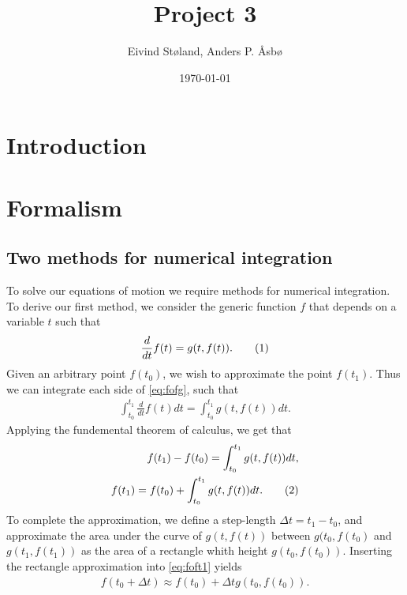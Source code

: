 \documentclass[reprint,english,notitlepage]{revtex4-1}  %
\newcommand\numberthis{\addtocounter{equation}{1}\tag{\theequation}}
\begin{document}
\title{Project 3}   %
\author{Eivind Støland, Anders P. Åsbø}               %
\date{\today}                             %
\noaffiliation                            %

\maketitle                                %


\tableofcontents

\section{Introduction} \label{sec:I}

\section{Formalism} \label{sec:II}

\subsection{Two methods for numerical integration} \label{sec:II:a}
To solve our equations of motion we require methods for numerical integration. To derive our first method, we consider the generic function \(f\) that depends on a variable \(t\) such that
\begin{align*}
	\frac{d}{dt}f(t) = g(t, f(t)). \numberthis \label{eq:fofg}
\end{align*}
Given an arbitrary point \(f(t_{0})\), we wish to approximate the point \(f(t_{1})\). Thus we can integrate each side of \eqref{eq:fofg}, such that
\begin{align*}
	\int_{t_{0}}^{t_{1}} \frac{d}{dt} f(t) dt = \int_{t_{0}}^{t_{1}} g(t, f(t)) dt.
\end{align*}
Applying the fundemental theorem of calculus, we get that
\begin{align*}
	f(t_{1}) - f(t_{0}) = \int_{t_{0}}^{t_{1}} g(t, f(t)) dt, \\
	f(t_{1}) = f(t_{0}) + \int_{t_{0}}^{t_{1}} g(t, f(t)) dt. \numberthis \label{eq:foft1}
\end{align*}
To complete the approximation, we define a step-length \(\Delta t = t_{1}-t_{0}\), and approximate the area under the curve of \(g(t, f(t))\) between \(g(t_{0}, f(t_{0})\) and \(g(t_{1}, f(t_{1}))\) as the area of a rectangle whith height \(g(t_{0}, f(t_{0}))\). Inserting the rectangle approximation into \eqref{eq:foft1} yields
\begin{align*}
	f(t_{0} + \Delta t) \approx f(t_{0}) + \Delta t g(t_{0}, f(t_{0})).
\end{align*}
\end{document}
